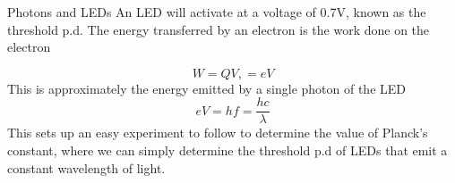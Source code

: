 \documentclass[../Main.tex]{subfiles}
\begin{document}
\begin{frame}{Photons and LEDs}
    An LED will activate at a voltage of 0.7V, known as the threshold p.d. The energy transferred by an electron is the work done on the electron
    
    \begin{equation*}
        W=QV, = eV
    \end{equation*}
    This is approximately the energy emitted by a single photon of the LED
    \begin{equation*}
        eV = hf = \frac{hc}{\lambda}
    \end{equation*}
    This sets up an easy experiment to follow to determine the value of Planck's constant, where we can simply determine the threshold p.d of LEDs that emit a constant wavelength of light.
\end{frame}
\end{document}
